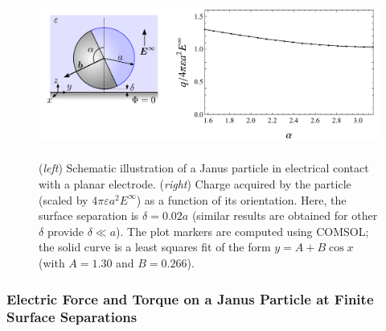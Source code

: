 \begin{appendices}
\begin{figure}[h]
    \centering
    \includegraphics[height=5.5cm]{figures/A1_ContactCharge.pdf}
    \caption{(\emph{left}) Schematic illustration of a Janus particle in electrical contact with a planar electrode. (\emph{right}) Charge acquired by the particle (scaled by $4\pi \varepsilon a^2 E^{\infty}$) as a function of its orientation.  Here, the surface separation is $\delta= 0.02 a$ (similar results are obtained for other $\delta$ provide $\delta\ll a$). The plot markers are computed using COMSOL; the solid curve is a least squares fit of the form $y=A + B \cos x$ (with $A=1.30$ and $B=0.266$).}
    \label{fig:ContactCharge}
\end{figure}


\subsubsection{Electric Force and Torque on a Janus Particle at Finite Surface Separations}


\end{appendices}
